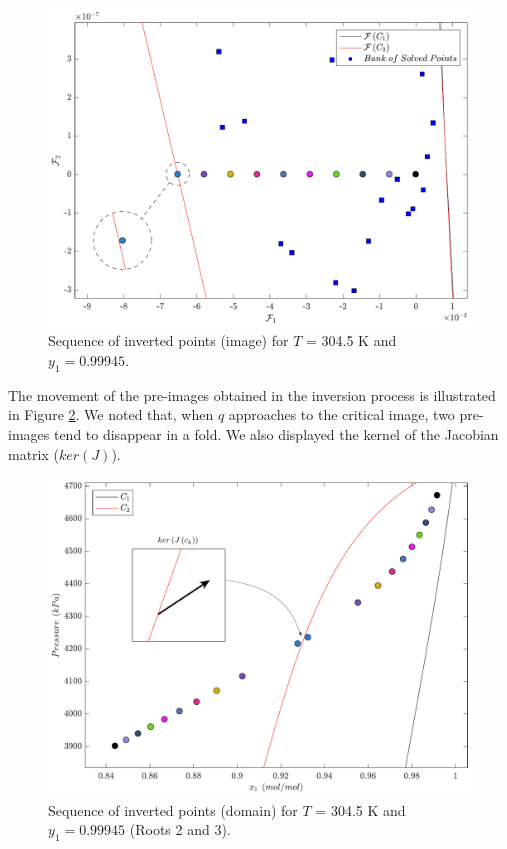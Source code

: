 \documentclass[journal=iecred,manuscript=article]{achemso}
\theoremstyle{definition}
\theoremstyle{remark}
\begin{document}
\begin{figure}
	\begin{center}
		\includegraphics[scale=0.45]{imagem3.pdf}
		\caption{Sequence of inverted points (image) for $T$ = 304.5 K and $y_1 = 0.99945$.}\label{fig:imagem_S}
	\end{center}
\end{figure}

The movement of the pre-images obtained in the inversion process is illustrated in Figure \ref{fig:domain_S}. We noted that, when $q$ approaches to the critical image, two pre-images tend to disappear in a fold. We also displayed the kernel of the Jacobian matrix ($ker(J)$).

\begin{figure}
	\begin{center}
		\includegraphics[scale=0.50]{dominio3.pdf}
		\caption{Sequence of inverted points (domain) for $T$ = 304.5 K and $y_1 = 0.99945$ (Roots 2 and 3).}\label{fig:domain_S}
	\end{center}
\end{figure}
\end{document}
